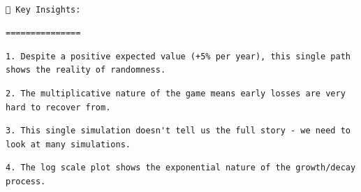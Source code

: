 \documentclass[
  letterpaper,
  DIV=11,
  numbers=noendperiod]{scrartcl}
\theoremstyle{definition}
\theoremstyle{remark}
\begin{document}
\begin{verbatim}

🤔 Key Insights:
\end{verbatim}

\begin{verbatim}
===============
\end{verbatim}

\begin{verbatim}
1. Despite a positive expected value (+5% per year), this single path shows the reality of randomness.
\end{verbatim}

\begin{verbatim}
2. The multiplicative nature of the game means early losses are very hard to recover from.
\end{verbatim}

\begin{verbatim}
3. This single simulation doesn't tell us the full story - we need to look at many simulations.
\end{verbatim}

\begin{verbatim}
4. The log scale plot shows the exponential nature of the growth/decay process.
\end{verbatim}
\end{document}
